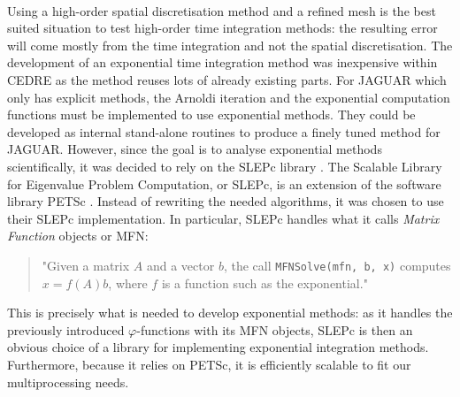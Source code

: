       \paragraph{}
      Using a high-order spatial discretisation method and a refined mesh is the best suited situation to test high-order time integration methods: the resulting error will come mostly from the time integration and not the spatial discretisation.
      The development of an exponential time integration method was inexpensive within CEDRE as the method reuses lots of already existing parts.
      For JAGUAR which only has explicit methods, the Arnoldi iteration and the exponential computation functions must be implemented to use exponential methods.
      They could be developed as internal stand-alone routines to produce a finely tuned method for JAGUAR.
      However, since the goal is to analyse exponential methods scientifically, it was decided to rely on the SLEPc library \cite{HernandezRomanVidal2005}.
      The Scalable Library for Eigenvalue Problem Computation, or SLEPc, is an extension of the software library PETSc \cite{petsc-web-page, petsc-user-ref, petsc-efficient}.
      Instead of rewriting the needed algorithms, it was chosen to use their SLEPc implementation.
      In particular, SLEPc handles what it calls \emph{Matrix Function} objects or MFN:
      \begin{quote}
        "Given a matrix $A$ and a vector $b$, the call \texttt{MFNSolve(mfn, b, x)} computes \\
        $x=f\left(A\right) b$, where $f$ is a function such as the exponential."
      \end{quote}
      This is precisely what is needed to develop exponential methods: as it handles the previously introduced $\varphi$-functions with its MFN objects, SLEPc is then an obvious choice of a library for implementing exponential integration methods.
      Furthermore, because it relies on PETSc, it is efficiently scalable to fit our multiprocessing needs.

